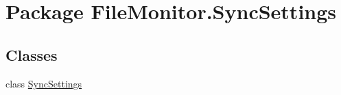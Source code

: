 \hypertarget{namespace_file_monitor_1_1_sync_settings}{\section{Package File\-Monitor.\-Sync\-Settings}
\label{namespace_file_monitor_1_1_sync_settings}
}
\subsection*{Classes}
\begin{DoxyCompactItemize}
\item 
class \hyperlink{class_file_monitor_1_1_sync_settings_1_1_sync_settings}{Sync\-Settings}
\end{DoxyCompactItemize}
